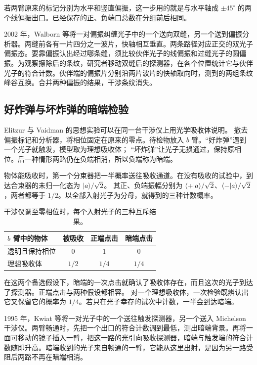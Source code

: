 若两臂原来的标记分别为水平和竖直偏振，这一步用的就是与水平轴成 $\pm45^\circ$ 的两个线偏振出口。已经保存的正、负端口总数在分组前后相同。

\label{exp:qm-eraser-2002}2002 年，Walborn 等将一对偏振纠缠光子中的一个送向双缝，另一个送到偏振分析器。两缝前各有一片四分之一波片，快轴相互垂直。两条路径对应正交的双光子偏振态。要靠偏振认出经过哪条缝，须比较伙伴光子的线偏振和过缝光子的圆偏振。为观察擦除后的条纹，研究者移动双缝后的探测器，在各个位置统计它与伙伴光子的符合计数。伙伴端的偏振片分别沿两片波片的快轴取向时，测到的两组条纹峰谷互换。合并两种偏振的结果，干涉条纹消失\cite{eraser-double-slit}。

\subsection{好炸弹与坏炸弹的暗端检验}
\label{ss:qm-absorber-test}
Elitzur 与 Vaidman 的思想实验可以在同一台干涉仪上用光学吸收体说明\cite{ev-object,kwiat-object}。
撤去偏振标记和分析器，将相位固定在原来的零点。待检物放入 $b$ 臂。“好炸弹”遇到一个光子就触发，模型取为理想吸收体；
“坏炸弹”让光子无损通过，保持原相位。后一种情形两路仍在负端相消，所以负端称为暗端。

物体能吸收时，第一个分束器把一半概率送往吸收通道。在没有吸收的试验中，到达合束器的未归一化态为 $\lvert a\rangle/\sqrt2$。
其正、负端振幅分别为 $\langle+\vert a\rangle/\sqrt2$、$\langle-\vert a\rangle/\sqrt2$，两者都等于 $1/2$。以全部入射光子为分母，就得到的三种计数概率。

\begin{table}[H]
\centering
\caption{干涉仪调至零相位时，每个入射光子的三种互斥结果。}
\label{tab:qm-dark-port}
\begin{tabular}{lccc}
    \toprule
    $b$ 臂中的物体 & 被吸收 & 正端点击 & 暗端点击 \\
    \midrule
    透明且保持相位 & $0$ & $1$ & $0$ \\
    理想吸收体 & $1/2$ & $1/4$ & $1/4$ \\
    \bottomrule
\end{tabular}
\end{table}

在这两个备选假设下，暗端的一次点击就确认了吸收体存在，而且这次的光子到达了探测器。正端点击与两种假设都相容。
对一个理想吸收体，一次检验既辨认出它又保留它的概率为 $1/4$。若只在光子幸存的试次中计数，一半会到达暗端。

\label{exp:qm-absorber-1995}1995 年，Kwiat 等将一对光子中的一个送往触发探测器，另一个送入 Michelson 干涉仪。两臂畅通时，先把一个出口的符合计数调到最低，测出暗端背景。再将一面可移动的镜子插入一臂，把这一路的光引向吸收探测器，暗端与触发端的符合计数随即升高。暗端收到的光子来自畅通的一臂，它能从这里出射，是因为另一路受阻后两路不再在暗端相消\cite{kwiat-object}。


